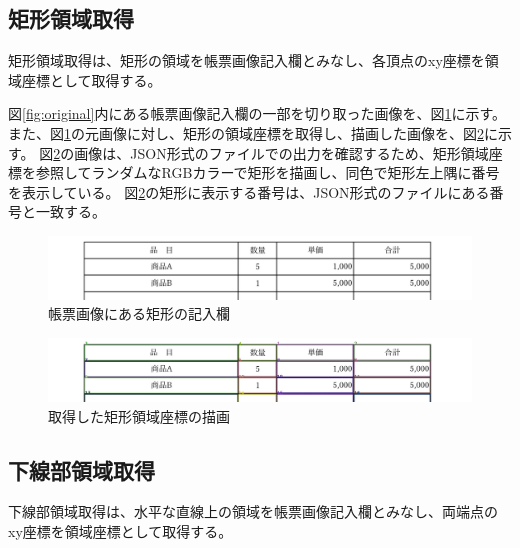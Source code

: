 \subsection{矩形領域取得}\label{subsec:rect_coords_obtainment}
矩形領域取得は、矩形の領域を帳票画像記入欄とみなし、各頂点のxy座標を領域座標として取得する。

図\ref{fig:original}内にある帳票画像記入欄の一部を切り取った画像を、図\ref{fig:rect_original}に示す。
また、図\ref{fig:rect_original}の元画像に対し、矩形の領域座標を取得し、描画した画像を、図\ref{fig:rect_drawing}に示す。
図\ref{fig:rect_drawing}の画像は、JSON形式のファイルでの出力を確認するため、矩形領域座標を参照してランダムなRGBカラーで矩形を描画し、同色で矩形左上隅に番号を表示している。
図\ref{fig:rect_drawing}の矩形に表示する番号は、JSON形式のファイルにある番号と一致する。

\begin{figure}[t]
    \begin{center}
        \includegraphics[width=15cm]{image/03-function/rect_original.jpg}
        \caption{帳票画像にある矩形の記入欄}
        \label{fig:rect_original}
    \end{center}
\end{figure}

\begin{figure}[t]
    \begin{center}
        \includegraphics[width=15cm]{image/03-function/rect_drawing.jpg}
        \caption{取得した矩形領域座標の描画}
        \label{fig:rect_drawing}
    \end{center}
\end{figure}



\subsection{下線部領域取得}\label{subsec:underline_coords_obtainment}
下線部領域取得は、水平な直線上の領域を帳票画像記入欄とみなし、両端点のxy座標を領域座標として取得する。

